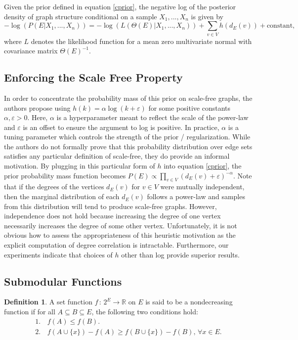 \documentclass{uwstat572}
\theoremstyle{remark}
\theoremstyle{definition}
\newtheorem{definition}{Definition}[section]
\begin{document}
Given the prior defined in equation \eqref{cprior}, the negative log of the posterior density of graph structure conditional on a sample $X_1,...,X_n$ is given by
\begin{equation}\label{logpost}
    -\log( P( E | X_1,...,X_n)) = - \log(L(\Theta(E) | X_1,...,X_n) ) + \sum_{v \in V} h( d_E(v)) + \text{constant},
\end{equation}
where $L$ denotes the likelihood function for a mean zero multivariate normal with covariance matrix $\Theta(E)^{-1}$. 

\subsection{Enforcing the Scale Free Property}

In order to concentrate the probability mass of this prior on scale-free graphs, the authors propose using $h(k) = \alpha \log(k + \varepsilon)$ for some positive constants $\alpha, \varepsilon > 0$.  Here, $\alpha$ is a  hyperparameter meant to reflect the scale of the power-law and $\varepsilon$ is an offset to ensure the argument to log is positive. In practice, $\alpha$ is a tuning parameter which controls the strength of the prior / regularization. While the authors do not formally prove that this probability distribution over edge sets satisfies any particular definition of scale-free, they do provide an informal motivation.  By plugging in this particular form of $h$ into equation \eqref{cprior}, the prior probability mass function becomes $P( E) \propto \prod_{v \in V} (d_E(v) + \varepsilon)^{-\alpha}$. Note that if the degrees of the vertices $d_E(v)$ for $v \in V$ were mutually independent, then the marginal distribution of each $d_E(v)$ follows a power-law and samples from this distribution will tend to produce scale-free graphs.  However, independence does not hold because increasing the degree of one vertex necessarily increases the degree of some other vertex.  Unfortunately, it is not obvious how to assess the appropriateness of this heuristic motivation as the explicit computation of degree correlation is intractable.  Furthermore, our experiments indicate that choices of $h$ other than log provide superior results.

\subsection{Submodular Functions}

\theoremstyle{definition}
\begin{definition}
A set function $f \, : \, 2^E \to \mathbb{R}$ on $E$ is said to be a nondecreasing  function if for all $A \subseteq B \subseteq E$, the following two conditions hold:
\begin{equation*}
\begin{aligned}
1. \,& f(A) \leq f(B).
\\
2. \, & f(A \cup \{x\}) - f(A) \geq f(B \cup \{x\}) - f(B), \, \forall x \in E.
\end{aligned}
\end{equation*}
\end{definition}
\end{document}
